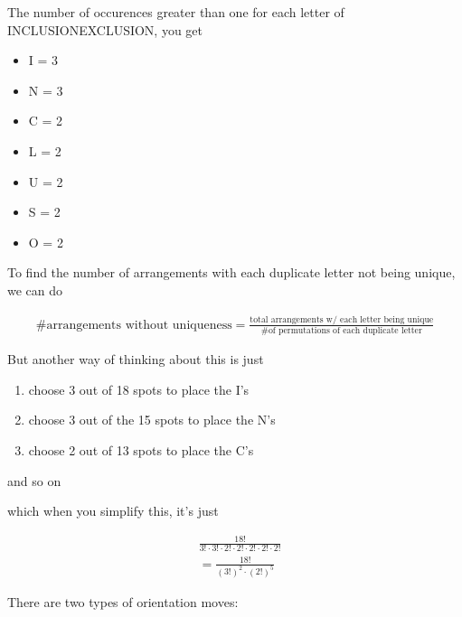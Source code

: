 \documentclass[../Main.tex]{subfiles}
\begin{document}
\begin{alphabet}
    
    \item
    {
        The number of occurences greater than one for each letter of INCLUSIONEXCLUSION, you get

        \begin{itemize}
            \item I = 3
            \item N = 3
            \item C = 2
            \item L = 2
            \item U = 2
            \item S = 2
            \item O = 2
        \end{itemize}

        To find the number of arrangements with each duplicate letter not being unique, we can do

        \begin{align*}
            \text{\# arrangements without uniqueness} = \frac{\text{total arrangements w/ each letter being unique}}{\text{\# of permutations of each duplicate letter}}
        \end{align*}

        But another way of thinking about this is just

        \begin{enumerate}
            \item choose 3 out of 18 spots to place the I's
            \item choose 3 out of the 15 spots to place the N's
            \item choose 2 out of 13 spots to place the C's
        \end{enumerate}

        and so on

        which when you simplify this, it's just

        \begin{align*}
            & \frac{18!}{3! \cdot 3! \cdot 2! \cdot 2! \cdot 2! \cdot 2! \cdot 2!} \\
            &= \boxed{\frac{18!}{(3!)^2 \cdot (2!)^5}}
        \end{align*}
    }

    \item
    {
        There are two types of orientation moves:

}
\end{alphabet}
\end{document}
